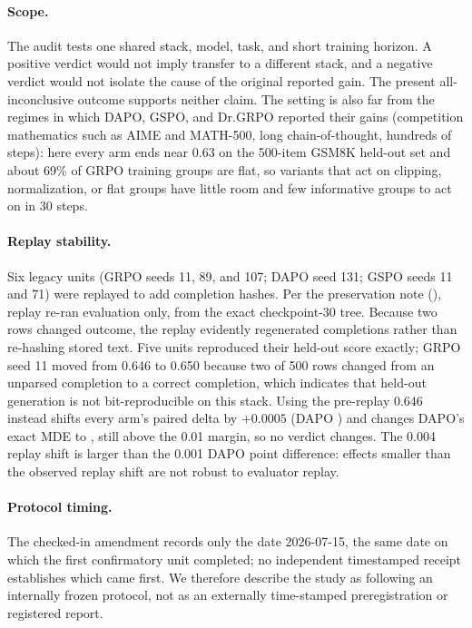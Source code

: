 \documentclass[11pt]{article}
\newcommand{\grpo}{\textsc{GRPO}}
\begin{document}
\paragraph{Scope.} The audit tests one shared stack, model, task, and short
training horizon. A positive verdict would not imply transfer to a different
stack, and a negative verdict would not isolate the cause of the original
reported gain. The present all-inconclusive outcome supports neither claim.
The setting is also far from the regimes in which DAPO, GSPO, and Dr.\grpo{}
reported their gains (competition mathematics such as AIME and MATH-500,
long chain-of-thought, hundreds of steps): here every arm ends near 0.63 on the
500-item GSM8K held-out set and about 69\% of GRPO training groups are flat, so variants that act on
clipping, normalization, or flat groups have little room and few informative
groups to act on in 30 steps.

\paragraph{Replay stability.} Six legacy units (GRPO seeds 11, 89, and 107;
DAPO seed 131; GSPO seeds 11 and 71) were replayed to add completion hashes.
Per the preservation note
(),
replay re-ran evaluation only, from the exact checkpoint-30 tree. Because two
rows changed outcome, the replay evidently regenerated completions rather than
re-hashing stored text. Five units reproduced their held-out score exactly;
GRPO seed 11 moved from 0.646 to 0.650 because two of 500 rows changed from an
unparsed completion to a correct completion, which indicates that held-out
generation is not bit-reproducible on this stack. Using the pre-replay 0.646
instead shifts every arm's paired delta by $+0.0005$ (DAPO
\HistDAPOPreReplayDelta{}) and changes DAPO's exact MDE to
\HistDAPOPreReplayMDE{}, still above the 0.01 margin, so no verdict changes.
The 0.004 replay shift is larger than the 0.001 DAPO point difference: effects
smaller than the observed replay shift are not robust to evaluator replay.

\paragraph{Protocol timing.} The checked-in amendment records only the date
2026-07-15, the same date on which the first confirmatory unit completed; no
independent timestamped receipt establishes which came first. We therefore
describe the study as following an internally frozen protocol, not as an
externally time-stamped preregistration or registered report.
\end{document}
